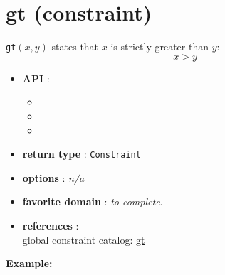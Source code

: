 \label{gt}
\hypertarget{gt}{}

\section{gt (constraint)}\label{gt:gtconstraint}\hypertarget{gt:gtconstraint}{}
\begin{notedef}
  \texttt{gt}$(x,y)$ states that $x$ is strictly greater than $y$:
$$x>y$$
\end{notedef}

\begin{itemize}
	\item \textbf{API} :
	\begin{itemize}
		\item {}
		\item {}
		\item {}
	\end{itemize}
	\item \textbf{return type} : \texttt{Constraint}
	\item \textbf{options} : \emph{n/a}
	\item \textbf{favorite domain} : \emph{to complete}.
	\item \textbf{references} :\\
      global constraint catalog: \href{http://www.emn.fr/x-info/sdemasse/gccat/Cgt.html}{gt}
\end{itemize}

\textbf{Example:}

